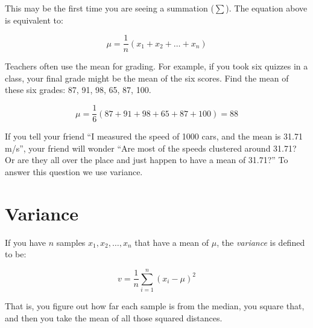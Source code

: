 This may be the first time you are seeing a summation ($\sum$). The equation above is equivalent to:

$$ \mu = \frac{1}{n} \left(x_1 + x_2 + \ldots + x_n\right)$$

\begin{Exercise}[title={Mean Grade}, label=grades_mean]

  Teachers often use the mean for grading. For example, if you took
  six quizzes in a class, your final grade might be the mean of the six
  scores. Find the mean of these six grades: 87, 91, 98, 65, 87, 100.

\end{Exercise}
\begin{Answer}[ref=grades_mean]

  $$\mu =\frac{1}{6} \left(87 + 91 + 98 + 65 + 87 + 100 \right) = 88$$

\end{Answer}

If you tell your friend ``I measured the speed of 1000 cars, and the
mean is 31.71 m/s'', your friend will wonder ``Are most of the speeds
clustered around 31.71? Or are they all over the place and just happen
to have a mean of 31.71?'' To answer this question we use variance.

\section{Variance}

\begin{mdframed}[style=important, frametitle={Definition of Variance}]

If you have $n$ samples $x_1, x_2, \ldots, x_n$ that have a mean of $\mu$, the \textit{variance} is defined to be:

$$v = \frac{1}{n}\sum_{i = 1}^{n} \left(x_i - \mu\right)^2$$
\end{mdframed}

That is, you figure out how far each sample is from the median, you
square that, and then you take the mean of all those squared
distances.

